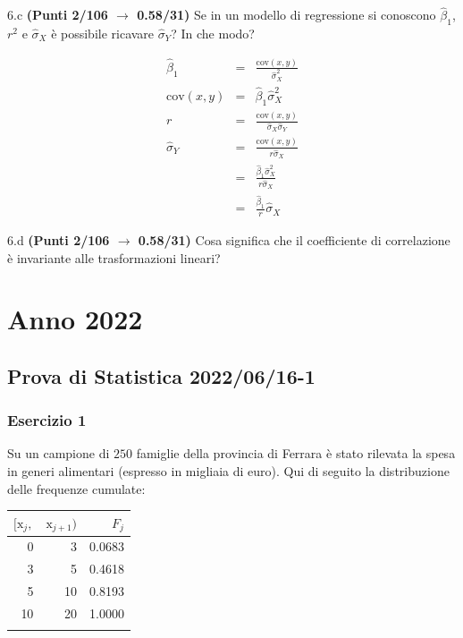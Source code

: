 \documentclass[
  11pt,
]{book}
\theoremstyle{mytheoremstyle}
\theoremstyle{mydefstyle}
\newenvironment{sol}
  {
  \begin{tcolorbox}[enhanced,breakable,arc=0.1mm,boxrule=1pt,colback=white,colframe=iblue,
  title=\bf \fontfamily{lmss}\selectfont \hspace{.5 cm} Soluzione,drop fuzzy shadow]

}{
\end{tcolorbox}
  }
\begin{document}
6.c \textbf{(Punti 2/106 \(\rightarrow\) 0.58/31)} Se in un modello di regressione si conoscono \(\hat\beta_1\), \(r^2\) e \(\hat\sigma_X\) è possibile ricavare \(\hat\sigma_Y\)? In che modo?

\begin{sol}
\begin{eqnarray*}
   \hat\beta_1 &=& \frac{\text{cov}(x,y)}{\hat\sigma_X^2}\\
   \text{cov}(x,y)&=&\hat\beta_1\hat\sigma_X^2\\
   r&=&\frac{\text{cov}(x,y)}{\hat\sigma_X\hat\sigma_Y}\\
   \hat\sigma_Y&=&\frac{\text{cov}(x,y)}{r\hat\sigma_X}\\
   &=&\frac{\hat\beta_1\hat\sigma_X^2}{r\hat\sigma_X}\\
   &=&\frac{\hat\beta_1}{r}\hat\sigma_X
\end{eqnarray*}

\end{sol}

6.d \textbf{(Punti 2/106 \(\rightarrow\) 0.58/31)} Cosa significa che il coefficiente di correlazione è invariante alle trasformazioni lineari?

\chapter{Anno 2022}\label{anno-2022}

\section{Prova di Statistica 2022/06/16-1}\label{prova-di-statistica-20220616-1}

\subsection{Esercizio 1}\label{esercizio-1-11}

Su un campione di \(250\) famiglie della provincia di Ferrara è stato rilevata la spesa in generi alimentari (espresso in migliaia di euro). Qui di seguito la distribuzione delle frequenze cumulate:

\begin{sol}

\begin{table}[H]
\centering
\begin{tabular}{rrr}
\toprule
$[\text{x}_j,$ & $\text{x}_{j+1})$ & $F_j$\\
\midrule
0 & 3 & 0.0683\\
3 & 5 & 0.4618\\
5 & 10 & 0.8193\\
10 & 20 & 1.0000\\
 &  & \\
\bottomrule
\end{tabular}
\end{table}

\end{sol}
\end{document}
